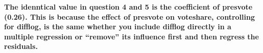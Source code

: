 \documentclass[12pt,letterpaper]{article}
\begin{document}
\begin{enumerate}
		\textbf{The idenntical value in question 4 and 5 is the coefficient of presvote (0.26). This is because the effect of presvote on voteshare, controlling for difflog, is the same whether you include difflog directly in a multiple regression or “remove” its influence first and then regress the residuals. }
	\end{enumerate}
\end{document}
